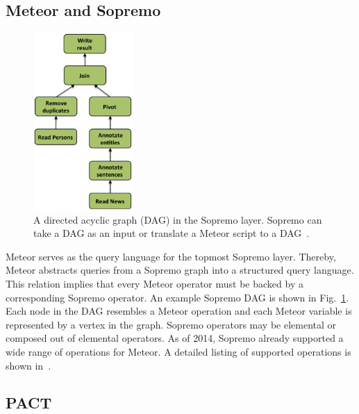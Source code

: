 \subsection{Meteor and Sopremo}\label{stratosphereSopremo}

\begin{figure}[!t]
\centering
\includegraphics[width=1.5in]{./img/SopremoDAG.png}
\caption{A directed acyclic graph (DAG) in the Sopremo layer. Sopremo can take a DAG as an input or translate a Meteor script to a DAG~\cite{Stratosphere2014}.}
\label{fig_stratosphere_sopremo_dag}
\end{figure}

Meteor serves as the query language for the topmost Sopremo layer. Thereby, Meteor abstracts queries from a Sopremo graph into a structured query language. This relation implies that every Meteor operator must be backed by a corresponding Sopremo operator. An example Sopremo DAG is shown in Fig.~\ref{fig_stratosphere_sopremo_dag}. Each node in the DAG resembles a Meteor operation and each Meteor variable is represented by a vertex in the graph. Sopremo operators may be elemental or composed out of elemental operators. As of 2014, Sopremo already supported a wide range of operations for Meteor. A detailed listing of supported operations is shown in~\cite{Stratosphere2014}.

\subsection{PACT}\label{straotspherePACT}


